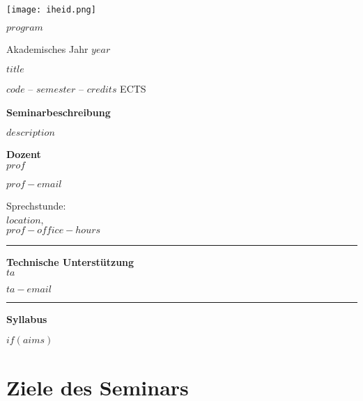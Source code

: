 \documentclass[11pt,a4paper]{article}
\author{$prof$}
\begin{document}
\hspace*{-1.25cm}
\texttt{[image: iheid.png]}
\vspace{0.25cm}


\begin{minipage}[t][98mm][t]{0.60\textwidth}
\textbf{\textcolor{TUColor}{$program$}}

Akademisches Jahr $year$
\vspace{0.25cm}

\textbf{\textcolor{TUColor}{$title$}}

$code$ -- $semester$ -- $credits$ ECTS
\vspace{0.25cm}

\textbf{\textcolor{TUColor}{Seminarbeschreibung}}

$description$
\vspace{0.25cm}
	\end{minipage}%
	\hspace{0.5cm}\vrule{}\hspace{0.5cm}
	\begin{minipage}[t][95mm][t]{0.30\textwidth}
	\begin{minipage}[t][37mm][t]{\textwidth}
	\textbf{Dozent}\\
	
	$prof$
	
	\vspace{0.1cm}
	$prof-email$
	\vspace{0.1cm}
	
Sprechstunde: \\
$location$,\\
$prof-office-hours$
	
	\end{minipage}
	\vspace{1cm}\hrule{}\vspace{0.5cm}
	\begin{minipage}[t][38mm][t]{\textwidth}
	\textbf{Technische Unterstützung}\\
	
	$ta$

	\vspace{0.1cm}
	$ta-email$

	\end{minipage}
	\end{minipage}
	\hrule{}
	\vspace{0.5cm}
	
\textbf{\textcolor{TUColor}{Syllabus}}	

$if(aims)$\section*{Ziele des Seminars}
\end{document}
